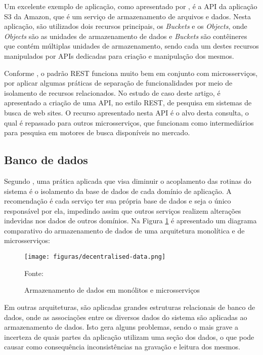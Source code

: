 Um excelente exemplo de aplicação, como apresentado por
, é a \ac{API} da aplicação S3 da Amazon, que é
um serviço de armazenamento de arquivos e dados. Nesta aplicação, são
utilizados dois recursos principais, os \emph{Buckets} e os \emph{Objects},
onde \emph{Objects} são as unidades de armazenamento de dados e \emph{Buckets}
são contêineres que contém múltiplas unidades de armazenamento, sendo cada
um destes recursos manipulados por \acp{API} dedicadas para criação e
manipulação dos mesmos.

Conforme , o padrão \ac{REST} funciona muito bem
em conjunto com microsserviços, por aplicar algumas práticas de separação
de funcionalidades por meio de isolamento de recursos relacionados. No
estudo de caso deste artigo, é apresentado a criação de uma \ac{API}, no
estilo \ac{REST}, de pesquisa em sistemas de busca de web sites. O recurso
apresentado nesta \ac{API} é o alvo desta consulta, o qual é repassado para
outros microsserviços, que funcionam como intermediários para pesquisa em
motores de busca disponíveis no mercado.

\subsection{Banco de dados}

Segundo , uma prática aplicada que visa diminuir o
acoplamento das rotinas do sistema é o isolamento da base de dados de cada
domínio de aplicação. A recomendação é cada serviço ter sua própria base de
dados e seja o único responsável por ela, impedindo assim que outros serviços
realizem alterações indevidas nos dados de outros domínios. Na Figura
\ref{fig:db-monolith-microservices} é apresentado um diagrama comparativo do
armazenamento de dados de uma arquitetura monolítica e de microsserviços:

\begin{figure}[H]
	\centering
	\caption{Armazenamento de dados em monólitos e microsserviços}
	\texttt{[image: figuras/decentralised-data.png]}

	\label{fig:db-monolith-microservices}
	\footnotesize Fonte: 
\end{figure}

Em outras arquiteturas, são aplicadas grandes estruturas relacionais de banco
de dados, onde as associações entre os diversos dados do sistema são
aplicadas ao armazenamento de dados. Isto gera alguns problemas, sendo o mais
grave a incerteza de quais partes da aplicação utilizam uma seção dos dados,
o que pode causar como consequência inconsistências na gravação e leitura
dos mesmos.

